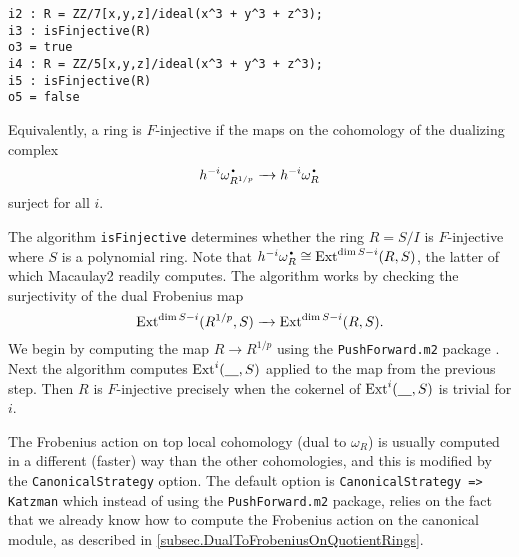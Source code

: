 \documentclass[11pt]{amsart}
\begin{document}
\begin{verbatim}
i2 : R = ZZ/7[x,y,z]/ideal(x^3 + y^3 + z^3);
i3 : isFinjective(R)
o3 = true
i4 : R = ZZ/5[x,y,z]/ideal(x^3 + y^3 + z^3);
i5 : isFinjective(R)
o5 = false
\end{verbatim}

Equivalently, a ring is $F$-injective if the maps on the cohomology of the dualizing complex
\[
h^{-i} \omega_{R^{1/p}}^{\mydot} \to h^{-i} \omega_R^{\mydot}
\]
surject for all $i$.

The algorithm \texttt{isFinjective} determines whether the ring $R = S/I$ is
$F$-injective where $S$ is a polynomial ring.  Note that $h^{-i} \omega_R^{\mydot} \cong \Ext^{\dim S - i}(R, S)$, the latter of which Macaulay2 readily computes.
The algorithm works by checking the surjectivity of the dual Frobenius map
\[
\operatorname{Ext}^{\dim S - i}(R^{1/p}, S) \xrightarrow{\ \ } \operatorname{Ext}^{\dim S - i}(R, S).
\]
We begin by computing the map $R
\rightarrow R^{1/p}$ using the \texttt{PushForward.m2} package \cite{PushForward}.
Next the algorithm computes
$\operatorname{Ext}^{i}( \underline{\hskip 10pt}, S)$ applied to the map from the previous step.  Then $R$ is $F$-injective precisely when the
cokernel of $\operatorname{Ext}^{i}( \underline{\hskip 10pt}, S)$ is trivial for $i$.

The Frobenius action on top local cohomology (dual to $\omega_R$) is usually computed in a different (faster) way than the other cohomologies, and this is modified by the \texttt{CanonicalStrategy} option.  The default option is \texttt{CanonicalStrategy => Katzman} which instead of using the \texttt{PushForward.m2} package, relies on the fact that we already know how to compute the Frobenius action on the canonical module, as described in \autoref{subsec.DualToFrobeniusOnQuotientRings}.


\end{document}
